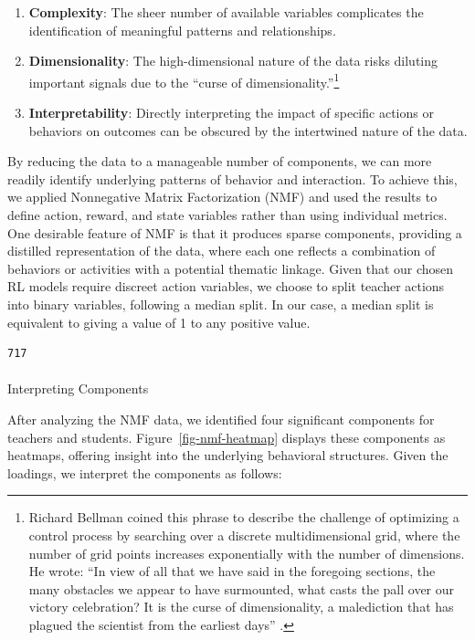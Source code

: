 \documentclass[
  number,
  preprint,
  3p,
  onecolumn]{elsarticle}
\makeatletter
\let\oldparagraph\paragraph
\renewcommand{\paragraph}{
    \@ifstar
      \xxxParagraphStar
      \xxxParagraphNoStar
  }
\newcommand{\xxxParagraphStar}[1]{\oldparagraph*{#1}\mbox{}}
\newcommand{\xxxParagraphNoStar}[1]{\oldparagraph{#1}\mbox{}}
\providecommand{\tightlist}{%
  \setlength{\itemsep}{0pt}\setlength{\parskip}{0pt}}\usepackage{longtable,booktabs,array}
\makeatother
\begin{document}
\begin{enumerate}
\def\labelenumi{\arabic{enumi}.}
\tightlist
\item
  \textbf{Complexity}: The sheer number of available variables
  complicates the identification of meaningful patterns and
  relationships.
\item
  \textbf{Dimensionality}: The high-dimensional nature of the data risks
  diluting important signals due to the ``curse of
  dimensionality.''\footnote{Richard Bellman coined this phrase to
    describe the challenge of optimizing a control process by searching
    over a discrete multidimensional grid, where the number of grid
    points increases exponentially with the number of dimensions. He
    wrote: ``In view of all that we have said in the foregoing sections,
    the many obstacles we appear to have surmounted, what casts the pall
    over our victory celebration? It is the curse of dimensionality, a
    malediction that has plagued the scientist from the earliest days''
    \citep{bellman2015adaptive}.}
\item
  \textbf{Interpretability}: Directly interpreting the impact of
  specific actions or behaviors on outcomes can be obscured by the
  intertwined nature of the data.
\end{enumerate}

By reducing the data to a manageable number of components, we can more
readily identify underlying patterns of behavior and interaction. To
achieve this, we applied Nonnegative Matrix Factorization (NMF) and used
the results to define action, reward, and state variables rather than
using individual metrics. One desirable feature of NMF is that it
produces sparse components, providing a distilled representation of the
data, where each one reflects a combination of behaviors or activities
with a potential thematic linkage. Given that our chosen RL models
require discreet action variables, we choose to split teacher actions
into binary variables, following a median split. In our case, a median
split is equivalent to giving a value of 1 to any positive value.

\begin{verbatim}
717
\end{verbatim}

\paragraph{Interpreting Components}\label{interpreting-components}

After analyzing the NMF data, we identified four significant components
for teachers and students. Figure~\ref{fig-nmf-heatmap} displays these
components as heatmaps, offering insight into the underlying behavioral
structures. Given the loadings, we interpret the components as follows:
\end{document}
